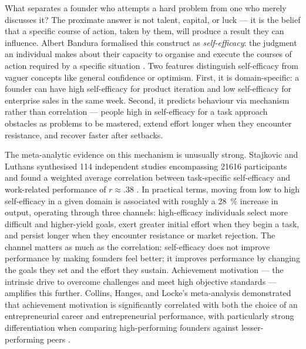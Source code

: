 What separates a founder who attempts a hard problem from one who merely discusses it? The
proximate answer is not talent, capital, or luck --- it is the belief that a specific course
of action, taken by them, will produce a result they can influence. Albert Bandura formalised
this construct as \emph{self-efficacy}: the judgment an individual makes about their capacity
to organise and execute the courses of action required by a specific situation
\parencite{bandura1997self}. Two features distinguish self-efficacy from vaguer concepts like
general confidence or optimism. First, it is domain-specific: a founder can have high
self-efficacy for product iteration and low self-efficacy for enterprise sales in the same
week. Second, it predicts behaviour via mechanism rather than correlation --- people high in
self-efficacy for a task approach obstacles as problems to be mastered, extend effort longer
when they encounter resistance, and recover faster after setbacks.

The meta-analytic evidence on this mechanism is unusually strong. Stajkovic and Luthans
synthesised \num{114} independent studies encompassing \num{21616} participants and found a
weighted average correlation between task-specific self-efficacy and work-related performance
of $r \approx .38$ %
\parencite{stajkovic1998self}. In practical terms, moving from low to high self-efficacy in a
given domain is associated with roughly a \qty{28}{\percent} increase in output, operating
through three channels: high-efficacy individuals select more difficult and higher-yield goals,
exert greater initial effort when they begin a task, and persist longer when they encounter
resistance or market rejection. The channel matters as much as the correlation: self-efficacy
does not improve performance by making founders feel better; it improves performance by
changing the goals they set and the effort they sustain. Achievement motivation --- the intrinsic
drive to overcome challenges and meet high objective standards --- amplifies this further.
Collins, Hanges, and Locke's meta-analysis demonstrated that achievement motivation is
significantly correlated with both the choice of an entrepreneurial career and entrepreneurial
performance, with particularly strong differentiation when comparing high-performing founders
against lesser-performing peers %
\parencite{collins2004achievement}.

